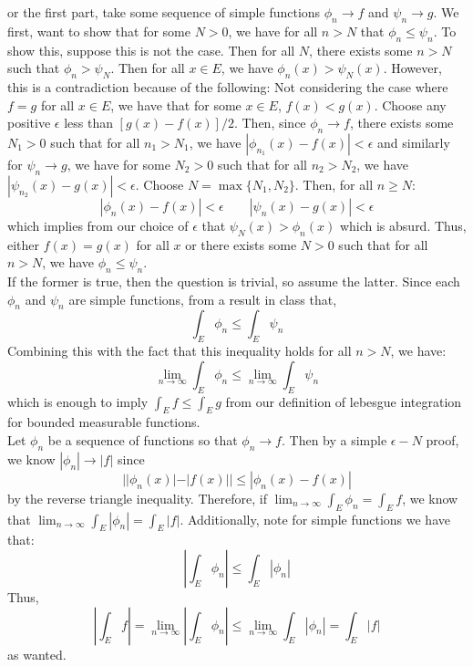\documentclass[12pt]{article}
\newenvironment{solution}[2][Solution]{\begin{trivlist}
\item[\hskip \labelsep {\bfseries #1}]}{\end{trivlist}}
\begin{document}
\begin{solution}

    For the first part, take some sequence of simple functions $\phi_n \to f$ and $\psi_n \to g$. We first, want to show that
    for some $N>0$, we have for all $n>N$ that $\phi_n \leq \psi_n$. To show this, suppose this is not the case. Then for all $N$,
    there exists some $n>N$ such that $\phi_n > \psi_N$. Then for all $x\in E$, we have $\phi_n(x) > \psi_N(x)$. However, this is
    a contradiction because of the following: Not considering the case where $f=g$ for all $x\in E$, we have that for some
    $x\in E$, $f(x) < g(x)$. Choose any positive $\epsilon$ less than $[g(x)-f(x)]/2$. Then, since $\phi_n \to f$, 
    there exists some $N_1>0$ such that for all $n_1>N_1$, we have $|\phi_{n_1}(x) - f(x)|<\epsilon$ and 
    similarly for $\psi_n \to g$, we have for some $N_2>0$ such that for all $n_2>N_2$, we have $|\psi_{n_2}(x) - g(x)|<\epsilon$. 
    Choose $N = \max\{N_1,N_2\}$. Then, for all $n\geq N$:
    \[ |\phi_n(x) -f(x)| < \epsilon \qquad |\psi_n(x) - g(x)| < \epsilon \]
    which implies from our choice of $\epsilon$ that $\psi_{N}(x) > \phi_n(x)$ which is absurd. Thus, either $f(x) = g(x)$ for all $x$
    or there exists some $N>0$ such that for all $n>N$, we have $\phi_n \leq \psi_n$. \\
    If the former is true, then the question is trivial, so assume the latter. Since each $\phi_n$ and $\psi_n$ are simple functions,
    from a result in class that, \[ \int_E \phi_n \leq \int_E \psi_n \]
    Combining this with the fact that this inequality holds for all $n>N$, we have:
    \[ \lim_{n\to\infty} \int_E \phi_n \leq \lim_{n\to\infty} \int_E \psi_n \]
    which is enough to imply $\int_E f \leq \int_E g$ from our definition of lebesgue integration for bounded measurable functions.\\
    
    Let $\phi_n$ be a sequence of functions so that $\phi_n \to f$. Then by a simple $\epsilon-N$ proof, we know $|\phi_n|\to |f|$ since
    \[ ||\phi_n(x)|-|f(x)|| \leq |\phi_n(x) - f(x)|\]
    by the reverse triangle inequality. Therefore, if $\lim_{n\to\infty} \int_E \phi_n = \int_E f$, we know that
    $\lim_{n\to\infty} \int_E |\phi_n| = \int_E |f|$. Additionally, note for simple functions we have that:
    \[ |\int_E \phi_n| \leq \int_E |\phi_n| \]
    Thus,
    \[ |\int_E f| = \lim_{n\to\infty} |\int_E \phi_n| \leq \lim_{n\to\infty} \int_E |\phi_n| = \int_E |f| \]
    as wanted.
    
\end{solution}
\pagebreak
\end{document}
